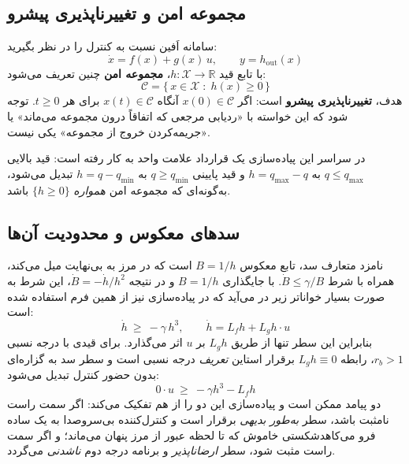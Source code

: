 \documentclass[10pt,twocolumn]{article}
\newcommand{\en}[1]{\lr{#1}}
\newcommand{\md}{\lr{\textemdash}}
\begin{document}
\subsection{مجموعه امن و تغییرناپذیری پیشرو}
سامانه اَفین نسبت به کنترل را در نظر بگیرید:
\begin{equation}
    \dot{x} = f(x) + g(x)\,u, \qquad y = h_{\mathrm{out}}(x)
    \label{eq:affine}
\end{equation}
با تابع قید $h:\mathcal{X}\to\mathbb{R}$، \textbf{مجموعه امن} چنین تعریف می‌شود:
\begin{equation}
    \mathcal{C} = \{\,x \in \mathcal{X} \;:\; h(x) \ge 0\,\}
    \label{eq:safeset}
\end{equation}
هدف، \textbf{تغییرناپذیری پیشرو} است: اگر $x(0)\in\mathcal{C}$ آنگاه
$x(t)\in\mathcal{C}$ برای هر $t\ge 0$. توجه شود که این خواسته با «ردیابی مرجعی
که اتفاقاً درون مجموعه می‌ماند» یا «جریمه‌کردن خروج از مجموعه» یکی نیست.

در سراسر این پیاده‌سازی یک قرارداد علامت واحد به کار رفته است: قید بالایی
$q\le q_{\max}$ به $h=q_{\max}-q$ و قید پایینی $q\ge q_{\min}$ به
$h=q-q_{\min}$ تبدیل می‌شود، به‌گونه‌ای که مجموعه امن \emph{همواره}
$\{h\ge 0\}$ باشد.

\subsection{سدهای معکوس و محدودیت آن‌ها}
نامزد متعارف سد، تابع معکوس $B=1/h$ است که در مرز به بی‌نهایت میل می‌کند، همراه
با شرط $\dot{B}\le \gamma/B$. با جایگذاری $B=1/h$ و در نتیجه
$\dot{B}=-\dot{h}/h^{2}$، این شرط به صورت بسیار خواناتر زیر در می‌آید که در
پیاده‌سازی نیز از همین فرم استفاده شده است:
\begin{equation}
    \dot{h} \ \ge\ -\gamma\, h^{3},
    \qquad
    \dot{h} = L_f h + L_g h\cdot u
    \label{eq:recip}
\end{equation}
بنابراین این سطر تنها از طریق $L_g h$ بر $u$ اثر می‌گذارد. برای قیدی با درجه
نسبی $r_b>1$، رابطه $L_g h \equiv 0$ برقرار است\md{}این \emph{تعریف} درجه نسبی
است \cite{khalil2002nonlinear}\md{}و سطر سد به گزاره‌ای بدون حضور کنترل تبدیل
می‌شود:
\begin{equation}
    0\cdot u \ \ge\ -\gamma h^{3} - L_f h
    \label{eq:degenerate}
\end{equation}
دو پیامد ممکن است و پیاده‌سازی این دو را از هم تفکیک می‌کند: اگر سمت راست
نامثبت باشد، سطر \emph{به‌طور بدیهی} برقرار است و کنترل‌کننده بی‌سروصدا به یک
\en{CLF-QP} ساده فرو می‌کاهد\md{}شکستی خاموش که تا لحظه عبور از مرز پنهان می‌ماند؛
و اگر سمت راست مثبت شود، سطر \emph{ارضاناپذیر} و برنامه درجه دوم \emph{ناشدنی}
می‌گردد.
\end{document}
